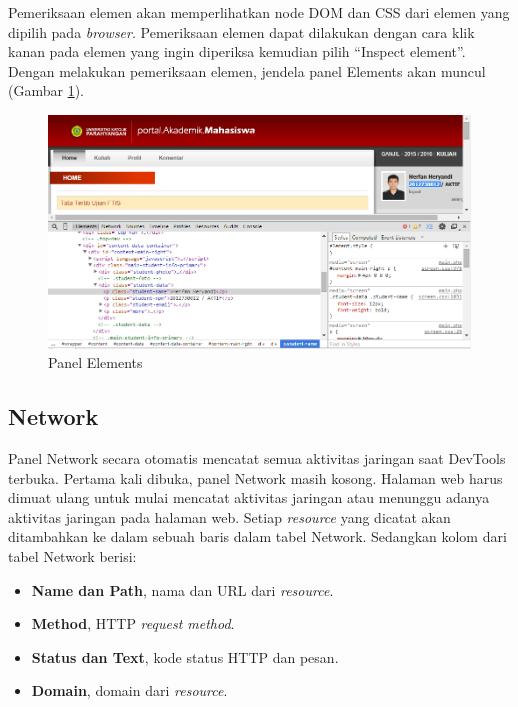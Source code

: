 Pemeriksaan elemen akan memperlihatkan node DOM dan CSS dari elemen yang dipilih pada \textit{browser}. Pemeriksaan elemen dapat dilakukan dengan cara klik kanan pada elemen yang ingin diperiksa kemudian pilih "`Inspect element"'. Dengan melakukan pemeriksaan elemen, jendela panel Elements akan muncul (Gambar \ref{fig:2_elements_panel}). 

\begin{figure}[H]
	\centering
	\includegraphics[scale=0.5]{Gambar/elements-panel}
	\caption{Panel Elements} 
	\label{fig:2_elements_panel}
\end{figure}

\subsection{Network}
Panel Network secara otomatis mencatat semua aktivitas jaringan saat DevTools terbuka. Pertama kali dibuka, panel Network masih kosong. Halaman web harus dimuat ulang untuk mulai mencatat aktivitas jaringan atau menunggu adanya aktivitas jaringan pada halaman web. Setiap \textit{resource} yang dicatat akan ditambahkan ke dalam sebuah baris dalam tabel Network. Sedangkan kolom dari tabel Network berisi:
\begin{itemize}
	\item \textbf{Name dan Path}, nama dan URL dari \textit{resource}.
	\item \textbf{Method}, HTTP \textit{request method}.
	\item \textbf{Status dan Text}, kode status HTTP dan pesan.
	\item \textbf{Domain}, domain dari \textit{resource}.
\end{itemize}


